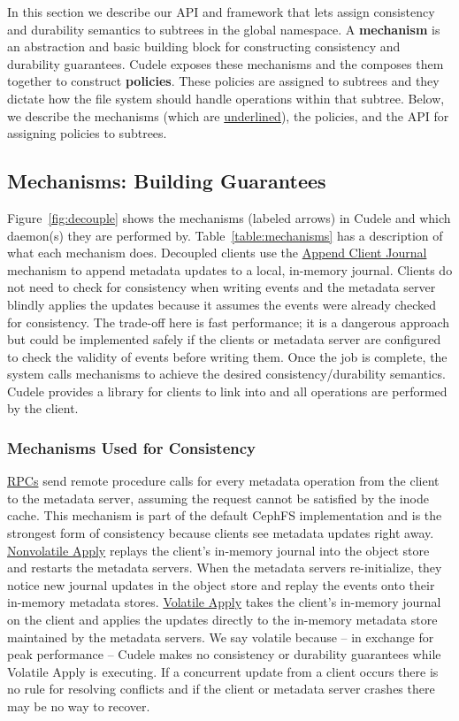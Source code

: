 In this section we describe our API and framework that lets
 assign consistency and durability
semantics to subtrees in the global namespace. A \textbf{mechanism} is an
abstraction and basic building block for constructing consistency and
durability guarantees. Cudele exposes these mechanisms and the
 composes them together to
construct \textbf{policies}.  These policies are assigned to subtrees and they
dictate how the file system should handle operations within that subtree.
Below, we describe the mechanisms (which are \underline{underlined}), the
policies, and the API for assigning policies to subtrees.

\subsection{Mechanisms: Building Guarantees}
\label{sec:the-cudelesfs-mechanisms}

Figure~\ref{fig:decouple} shows the mechanisms (labeled arrows) in Cudele and
which daemon(s) they are performed by.  Table~\ref{table:mechanisms} has a
description of what each mechanism does.  Decoupled clients use the
\underline{Append Client Journal} mechanism to append metadata updates to a
local, in-memory journal. Clients do not need to check for
consistency when writing events and the metadata server blindly applies the
updates because it assumes the events were already checked for consistency. The
trade-off here is fast performance; it is a dangerous approach but could be
implemented safely if the clients or metadata server are configured to check
the validity of events before writing them.  Once the job is complete, the
system calls mechanisms to achieve the desired consistency/durability
semantics.  Cudele provides a library for clients to link into and all
operations are performed by the client.  

\subsubsection{Mechanisms Used for Consistency} \underline{RPCs} send remote
procedure calls for every metadata operation from the client to the metadata
server, assuming the request cannot be satisfied by the inode cache. This
mechanism is part of the default CephFS implementation and is the strongest
form of consistency because clients see metadata updates right away.
\underline{Nonvolatile Apply} replays the client's in-memory journal into the
object store and restarts the metadata servers. When the metadata servers
re-initialize, they notice new journal updates in the object store and replay
the events onto their in-memory metadata stores.  \underline{Volatile Apply}
takes the client's in-memory journal on the client and applies the updates
directly to the in-memory metadata store maintained by the metadata servers. We
say volatile because -- in exchange for peak performance -- Cudele makes no
consistency or durability guarantees while Volatile Apply is executing.  If a
concurrent update from a client occurs there is no rule for resolving conflicts
and if the client or metadata server crashes there may be no way to recover.

